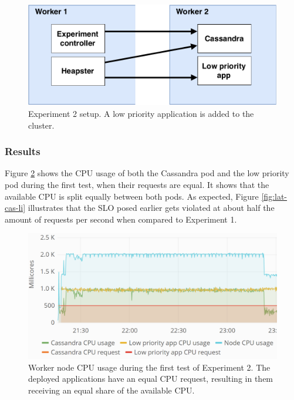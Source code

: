 \begin{figure}
\centering
\includegraphics[width=0.60\columnwidth]{Images/Experiments/Experiment_2.pdf}
\caption{Experiment 2 setup. A low priority application is added to the cluster.}
\label{fig:experiment2}
\end{figure}

\subsubsection{Results}
Figure \ref{fig:cpu-cas-lpp-li} shows the CPU usage of both the Cassandra pod and the low priority pod during the first test, when their requests are equal. It shows that the available CPU is split equally between both pods. As expected, Figure \ref{fig:lat-cas-li} illustrates that the SLO posed earlier gets violated at about half the amount of requests per second when compared to Experiment 1.

\begin{figure}
\centering
\includegraphics[width=0.90\columnwidth]{Images/Experiments/CPU/Grafana/cpu-cas-lpp-li.PNG}
\caption{Worker node CPU usage during the first test of Experiment 2. The deployed applications have an equal CPU request, resulting in them receiving an equal share of the available CPU.}
\label{fig:cpu-cas-lpp-li}
\end{figure}


